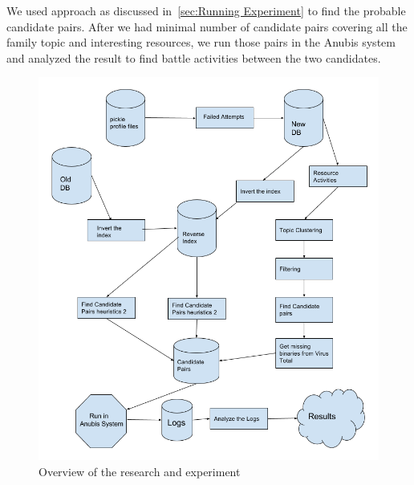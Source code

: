We used approach as discussed in~\autoref{sec:Running Experiment} to find the probable candidate pairs.
After we had minimal number of candidate pairs covering all the family topic and interesting resources, we run those pairs in the Anubis system and analyzed the result to find battle activities between the two candidates.
\begin{figure}[htbp]
  \centering
  \includegraphics[scale=0.4]{figures/bigpicture.png}
  \caption[Big Picture]{Overview of the research and experiment}\label{fig:bigpicture}
\end{figure}
